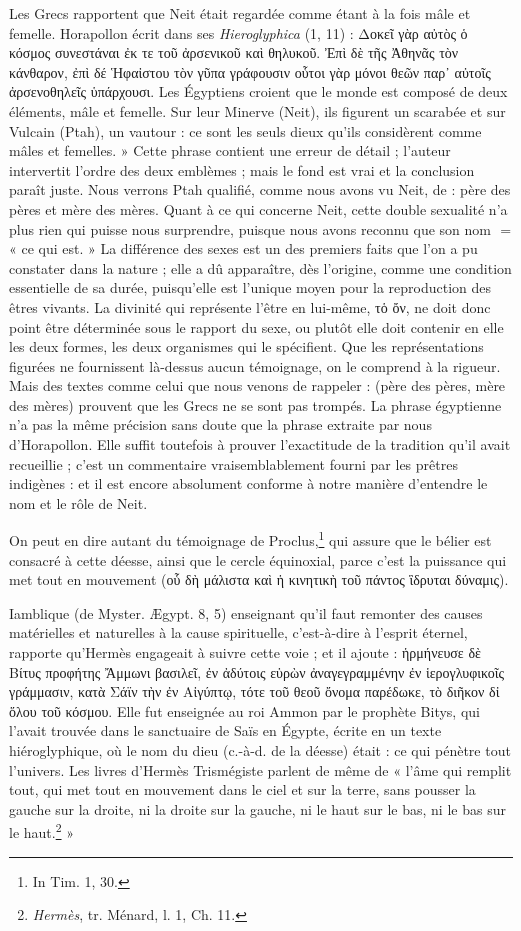 \documentclass[a4paper, 11pt, oneside]{article}
\newcommand*\hieroAAAQ{}
\begin{document}
Les Grecs rapportent que Neit était regardée comme étant à la fois mâle et femelle. Horapollon écrit dans ses \emph{Hieroglyphica} (1, 11) : Δοκεῖ γὰρ αὐτὸς ὁ κόσμος συνεστάναι ἐκ τε τοῦ ἀρσενικοῦ καὶ θηλυκοῦ. Ἐπὶ δὲ τῆς Ἀθηνᾶς τὸν κάνθαρον, ἐπὶ δέ Ἡφαἰστου τὸν γῦπα γράφουσιν οὗτοι γὰρ μόνοι θεῶν παρ᾽ αὐτοῖς ἀρσενοθηλεῖς ὑπάρχουσι. Les Égyptiens croient que le monde est composé de deux éléments, mâle et femelle. Sur leur Minerve (Neit), ils figurent un scarabée et sur Vulcain (Ptah), un vautour : ce sont les seuls dieux qu'ils considèrent comme mâles et femelles. » Cette phrase contient une erreur de détail ; l'auteur intervertit l'ordre des deux emblèmes ; mais le fond est vrai et la conclusion paraît juste. Nous verrons Ptah qualifié, comme nous avons vu Neit, de : père des pères et mère des mères. Quant à ce qui concerne Neit, cette double sexualité n'a plus rien qui puisse nous surprendre, puisque nous avons reconnu que son nom $\hieroAAAQ$ = « ce qui est. » La différence des sexes est un des premiers faits que l'on a pu constater dans la nature ; elle a dû apparaître, dès l'origine, comme une condition essentielle de sa durée, puisqu'elle est l'unique moyen pour la reproduction des êtres vivants. La divinité qui représente l'être en lui-même, τὁ ὄν, ne doit donc point être déterminée sous le rapport du sexe, ou plutôt elle doit contenir en elle les deux formes, les deux organismes qui le spécifient. Que les représentations figurées ne fournissent là-dessus aucun témoignage, on le comprend à la rigueur. Mais des textes comme celui que nous venons de rappeler : (père des pères, mère des mères) prouvent que les Grecs ne se sont pas trompés. La phrase égyptienne n'a pas la même précision sans doute que la phrase extraite par nous d'Horapollon. Elle suffit toutefois à prouver l'exactitude de la tradition qu'il avait recueillie ; c'est un commentaire vraisemblablement fourni par les prêtres indigènes : et il est encore absolument conforme à notre manière d'entendre le nom et le rôle de Neit.

On peut en dire autant du témoignage de Proclus,\footnote{In Tim. 1, 30.} qui assure que le bélier est consacré à cette déesse, ainsi que le cercle équinoxial, parce c'est la puissance qui met tout en mouvement (οὗ δὴ μάλιστα καὶ ἡ κινητικὴ τοῦ πάντος ἳδρυται δύναμις).

Iamblique (de Myster. Ægypt. 8, 5) enseignant qu'il faut remonter des causes matérielles et naturelles à la cause spirituelle, c'est-à-dire à l'esprit éternel, rapporte qu'Hermès engageait à suivre cette voie ; et il ajoute : ἡρμήνευσε δὲ Βίτυς προφήτης Ἄμμωνι βασιλεῖ, ἐν ἀδύτοις εὑρὼν ἀναγεγραμμένην ἐν ἱερογλυφικοῖς γράμμασιν, κατὰ Σάϊν τὴν ἐν Αἰγύπτῳ, τότε τοῦ θεοῦ ὄνομα παρέδωκε, τὸ διῆκον δἰ ὅλου τοῦ κόσμου. Elle fut enseignée au roi Ammon par le prophète Bitys, qui l'avait trouvée dans le sanctuaire de Saïs en Égypte, écrite en un texte hiéroglyphique, où le nom du dieu (c.-à-d. de la déesse) était : ce qui pénètre tout l'univers. Les livres d'Hermès Trismégiste parlent de même de « l'âme qui remplit tout, qui met tout en mouvement dans le ciel et sur la terre, sans pousser la gauche sur la droite, ni la droite sur la gauche, ni le haut sur le bas, ni le bas sur le haut.\footnote{\emph{Hermès}, tr. Ménard, l. 1, Ch. 11.} »
\end{document}
